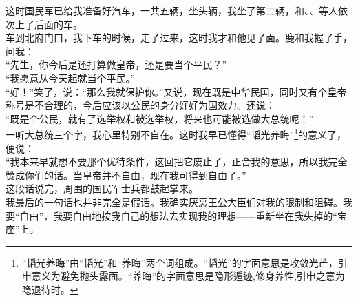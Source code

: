 这时国民军已给我准备好汽车，一共五辆，坐头辆，我坐了第二辆，和、、等人依次上了后面的车。\\

车到北府门口，我下车的时候，走了过来，这时我才和他见了面。鹿和我握了手，问我：\\

“先生，你今后是还打算做皇帝，还是要当个平民？”\\

“我愿意从今天起就当个平民。”\\

“好！”笑了，说：“那么我就保护你。”又说，现在既是中华民国，同时又有个皇帝称号是不合理的，今后应该以公民的身分好好为国效力。还说：\\

“既是个公民，就有了选举权和被选举权，将来也可能被选做大总统呢！”\\

一听大总统三个字，我心里特别不自在。这时我早已懂得“韬光养晦”\footnote{“韬光养晦”由“韬光”和“养晦”两个词组成。“韬光”的字面意思是收敛光芒，引申意义为避免抛头露面。“养晦”的字面意思是隐形遁迹,修身养性,引申之意为隐退待时。}的意义了，便说：\\

“我本来早就想不要那个优待条件，这回把它废止了，正合我的意思，所以我完全赞成你们的话。当皇帝并不自由，现在我可得到自由了。”\\

这段话说完，周围的国民军士兵都鼓起掌来。\\

我最后的一句话也并非完全是假话。我确实厌恶王公大臣们对我的限制和阻碍。我要“自由”，我要自由地按我自己的想法去实现我的理想——重新坐在我失掉的“宝座”上。
